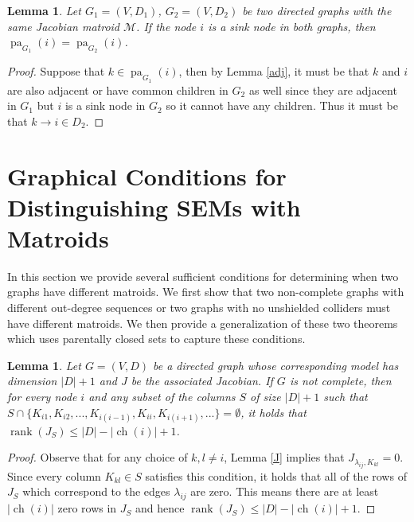 \documentclass[12pt,reqno]{amsart}
\theoremstyle{plain}
\newtheorem{lemma}[theorem]{Lemma}
\theoremstyle{definition}
\DeclareMathOperator{\pa}{pa}
\DeclareMathOperator{\ch}{ch}
\DeclareMathOperator{\rank}{rank}
\begin{document}
\begin{lemma}\label{sinks_and_inedges}
Let $G_1=(V,D_1)$, $G_2=(V,D_2)$ be two directed graphs with the same Jacobian matroid $\mathcal{M}$. If the node $i$ is a sink node in both graphs, then $\pa_{G_1}(i) = \pa_{G_2}(i)$. 
\end{lemma}
\begin{proof}
Suppose that $k \in \pa_{G_1}(i)$, then by Lemma \ref{adj}, it must be that $k$ and $i$ are also adjacent or have common children in $G_2$ as well since they are adjacent in $G_1$ but $i$ is a sink node in $G_2$ so it cannot have any children. Thus it must be that $k \to i \in D_2$. 
\end{proof}

\section{Graphical Conditions for Distinguishing SEMs with Matroids}
\label{sec:DistinguishingWithMatroids}
In this section we provide several sufficient conditions for determining when two graphs have different matroids. We first show that two non-complete graphs with different out-degree sequences or two graphs with no unshielded colliders must have different matroids. We then provide a generalization of these two theorems which uses parentally closed sets to capture these conditions.

\begin{lemma}\label{rankupbd}
Let $G=(V,D)$ be a directed graph whose corresponding model has dimension $|D|+1$ and $J$ be the associated Jacobian. If $G$ is not complete, then for every node $i$ and any subset of the columns $S$ of size $|D|+1$ such that 
$S \cap \{K_{i1},K_{i2},...,K_{i(i-1)},K_{ii},K_{i(i+1)},...\}=\emptyset$, it holds that
$\rank(J_S) \leq |D| - |\ch(i)| + 1$.
\end{lemma}
\begin{proof}
Observe that for any choice of $k, l \neq i$, Lemma \ref{J} implies that $J_{\lambda_{ij}, K_{kl}} = 0$. Since every column $K_{kl} \in S$ satisfies this condition, it holds that all of the rows of $J_S$ which correspond to the edges $\lambda_{ij}$ are zero. This means there are at least $|\ch(i)|$ zero rows in $J_S$ and hence $\rank(J_S) \leq |D| - |\ch(i)| +1$. 
\end{proof}
\end{document}
